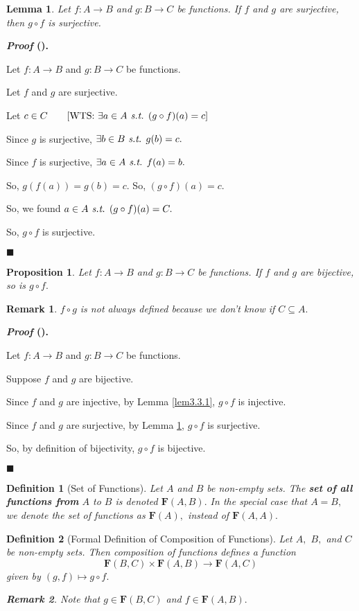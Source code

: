 \documentclass[12pt,a4paper]{article}
\newtheorem{df}{Definition}[subsection]
\newtheorem{prop}{Proposition}[subsection]
\newtheorem{lem}{Lemma}[subsection]
\newcounter{nprf}[subsection]
\newtheorem*{rmk}{\indent Remark}
\newenvironment*{prf}{\par\indent\textbf{\textit{Proof} (\stepcounter{nprf}\thenprf). }\par }{\par\hfill $\blacksquare$\par}
\def\of{\circ}
\def\F{\mathbf{F}}
\def\st{\emph{ s.t. }}
\begin{document}
\begin{framed}
\begin{lem}\label{lem3.3.2}
	Let $f:A\to B$ and $g: B\to C$ be functions. If $f$ and $g$ are surjective, then $g\of f$ is surjective. 
\end{lem}
\begin{prf}
	Let $f:A\to B$ and $g:B\to C$ be functions.\par Let $f$ and $g$ are surjective.\par Let $c\in C\qquad[\text{WTS: }\exists a\in A\st(g\of f)(a)=c]$\par Since $g$ is surjective, $\exists b\in B\st g(b)=c.$\par Since $f$ is surjective, $\exists a\in A\st f(a)=b.$\par So, $g(f(a))=g(b)=c.$ So, $(g\of f)(a)=c.$\par So, we found $a\in A\st(g\of f)(a)=C.$\par So, $g\of f$ is surjective.
\end{prf}
\end{framed}
\begin{framed}
\begin{prop}
	Let $f:A\to B$ and $g: B\to C$ be functions. If $f$ and $g$ are bijective, so is $g\of f.$
\end{prop}
	\begin{rmk}
		$f\of g$ is not always defined because we don't know if $C\subseteq A.$
	\end{rmk}
\begin{prf}
	Let $f:A\to B$ and $g:B\to C$ be functions.\par Suppose $f$ and $g$ are bijective.\par Since $f$ and $g$ are injective, by Lemma \ref{lem3.3.1}, $g\of f$ is injective.\par Since $f$ and $g$ are surjective, by Lemma \ref{lem3.3.2}, $g\of f$ is surjective.\par So, by definition of bijectivity, $g\of f$ is bijective. 
\end{prf}
\end{framed}
\begin{df}[Set of Functions]
	Let $A$ and $B$ be non-empty sets. The \textbf{set of all functions from} $A$ to $B$ is denoted $\F(A,B).$ In the special case that $A=B,$ we denote the set of functions as $\F(A),$ instead of $\F(A,A).$
\end{df}
\begin{df}[Formal Definition of Composition of Functions]
	Let $A,$ $B,$ and $C$ be non-empty sets. Then composition of functions defines a function \[\F(B,C)\times\F(A,B)\to\F(A,C)\] given by $(g,f)\mapsto g\of f.$
	\begin{rmk}
		Note that $g\in\F(B,C)$ and $f\in\F(A,B).$
	\end{rmk}	
\end{df}
\end{document}
